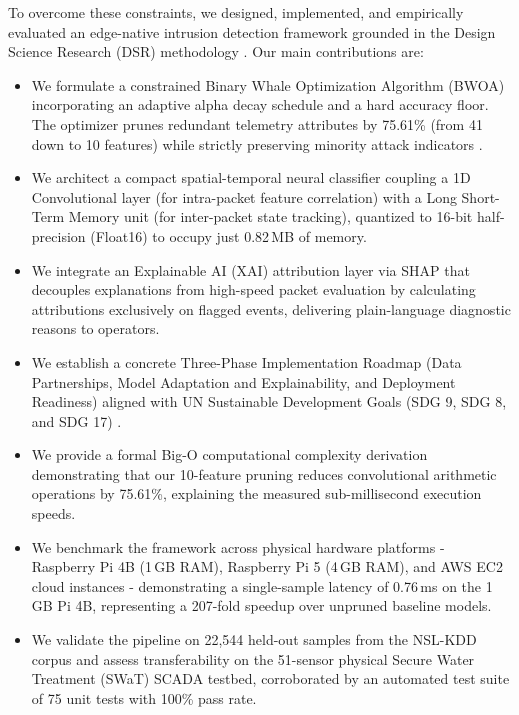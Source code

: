 \documentclass[conference]{IEEEtran}
\begin{document}
To overcome these constraints, we designed, implemented, and empirically evaluated an edge-native intrusion detection framework grounded in the Design Science Research (DSR) methodology \cite{peffers2007design, hevner2004design}. Our main contributions are:
\begin{itemize}
    \item We formulate a constrained Binary Whale Optimization Algorithm (BWOA) incorporating an adaptive alpha decay schedule and a hard accuracy floor. The optimizer prunes redundant telemetry attributes by 75.61\% (from 41 down to 10 features) while strictly preserving minority attack indicators \cite{anand2024whale, krishnaveni2025optimizing}.
    \item We architect a compact spatial-temporal neural classifier coupling a 1D Convolutional layer (for intra-packet feature correlation) with a Long Short-Term Memory unit (for inter-packet state tracking), quantized to 16-bit half-precision (Float16) to occupy just 0.82\,MB of memory.
    \item We integrate an Explainable AI (XAI) attribution layer via SHAP \cite{lundberg2017unified, oyedotun2025towards} that decouples explanations from high-speed packet evaluation by calculating attributions exclusively on flagged events, delivering plain-language diagnostic reasons to operators.
    \item We establish a concrete Three-Phase Implementation Roadmap (Data Partnerships, Model Adaptation and Explainability, and Deployment Readiness) aligned with UN Sustainable Development Goals (SDG 9, SDG 8, and SDG 17) \cite{un2015transforming}.
    \item We provide a formal Big-O computational complexity derivation demonstrating that our 10-feature pruning reduces convolutional arithmetic operations by 75.61\%, explaining the measured sub-millisecond execution speeds.
    \item We benchmark the framework across physical hardware platforms - Raspberry Pi 4B (1\,GB RAM), Raspberry Pi 5 (4\,GB RAM), and AWS EC2 cloud instances - demonstrating a single-sample latency of 0.76\,ms on the 1\,GB Pi 4B, representing a 207-fold speedup over unpruned baseline models.
    \item We validate the pipeline on 22,544 held-out samples from the NSL-KDD corpus and assess transferability on the 51-sensor physical Secure Water Treatment (SWaT) SCADA testbed, corroborated by an automated test suite of 75 unit tests with 100\% pass rate.
\end{itemize}
\end{document}
